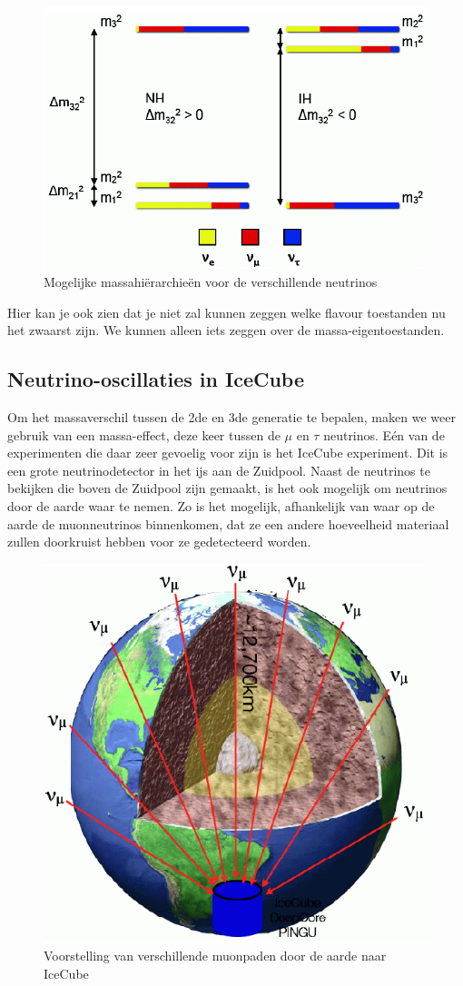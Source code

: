 \documentclass[../main.tex]{subfiles}
\begin{document}
\begin{figure}[h]
    \centering
    \includegraphics[width=0.5\linewidth]{neutrinos/massa_hier.png}
    \caption{Mogelijke massahiërarchieën voor de verschillende neutrinos}%
    \label{fig:neutrinos/massa_hier}
\end{figure}

Hier kan je ook zien dat je niet zal kunnen zeggen welke flavour toestanden nu het zwaarst zijn. We kunnen alleen iets zeggen over de massa-eigentoestanden.

\subsection{Neutrino-oscillaties in IceCube}%
\label{sub:neutrino_oscillaties_in_icecube}

Om het massaverschil tussen de 2de en 3de generatie te bepalen, maken we weer gebruik van een massa-effect, deze keer tussen de $\mu$ en $\tau$ neutrinos. Eén van de experimenten die daar zeer gevoelig voor zijn is het IceCube experiment. Dit is een grote neutrinodetector in het ijs aan de Zuidpool. Naast de neutrinos te bekijken die boven de Zuidpool zijn gemaakt, is het ook mogelijk om neutrinos door de aarde waar te nemen. Zo is het mogelijk, afhankelijk van waar op de aarde de muonneutrinos binnenkomen, dat ze een andere hoeveelheid materiaal zullen doorkruist hebben voor ze gedetecteerd worden.

\begin{figure}[h]
    \centering
    \includegraphics[width=0.3\linewidth]{neutrinos/icecube_voorstelling.png}
    \caption{Voorstelling van verschillende muonpaden door de aarde naar IceCube}%
    \label{fig:neutrinos/icecube_voorstelling}
\end{figure}
\end{document}
